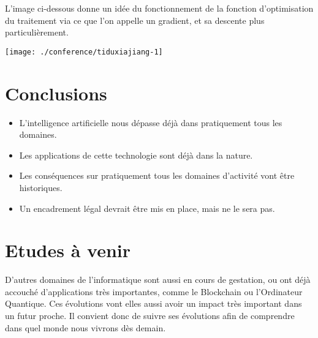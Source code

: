 \documentclass[a0,landscape]{a0poster}
\begin{document}
\begin{multicols}{4}
L'image ci-dessous donne un idée du fonctionnement de la fonction d'optimisation du traitement via ce que l'on appelle un gradient, et sa descente plus particulièrement.
\begin{center}\vspace{1cm}
\texttt{[image: ./conference/tiduxiajiang-1]}
\end{center}\vspace{1cm}


\color{IndianRed} %

\section*{Conclusions}

\begin{itemize}
\item L'intelligence artificielle nous dépasse déjà dans pratiquement tous les domaines.
\item Les applications de cette technologie sont déjà dans la nature.
\item Les conséquences sur pratiquement tous les domaines d'activité vont être historiques.
\item Un encadrement légal devrait être mis en place, mais ne le sera pas.
\end{itemize}

\color{DarkSlateGray} %


\section*{Etudes à venir}

D'autres domaines de l'informatique sont aussi en cours de gestation, ou ont déjà accouché d'applications très importantes, comme le Blockchain ou l'Ordinateur Quantique. Ces évolutions vont elles aussi avoir un impact très important dans un futur proche. Il convient donc de suivre ses évolutions afin de comprendre dans quel monde nous vivrons dès demain.


\end{multicols}
\end{document}
